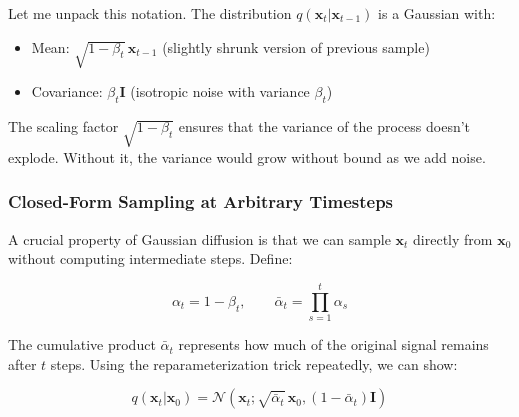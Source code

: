Let me unpack this notation. The distribution $q(\mathbf{x}_t | \mathbf{x}_{t-1})$ is a Gaussian with:
\begin{itemize}
    \item Mean: $\sqrt{1-\beta_t}\,\mathbf{x}_{t-1}$ (slightly shrunk version of previous sample)
    \item Covariance: $\beta_t \mathbf{I}$ (isotropic noise with variance $\beta_t$)
\end{itemize}

The scaling factor $\sqrt{1-\beta_t}$ ensures that the variance of the process doesn't explode. Without it, the variance would grow without bound as we add noise.

\subsubsection{Closed-Form Sampling at Arbitrary Timesteps}

A crucial property of Gaussian diffusion is that we can sample $\mathbf{x}_t$ directly from $\mathbf{x}_0$ without computing intermediate steps. Define:

\begin{equation}
\alpha_t = 1 - \beta_t, \qquad \bar{\alpha}_t = \prod_{s=1}^{t} \alpha_s
\label{eq:alpha_definitions}
\end{equation}

The cumulative product $\bar{\alpha}_t$ represents how much of the original signal remains after $t$ steps. Using the reparameterization trick repeatedly, we can show:

\begin{equation}
q(\mathbf{x}_t | \mathbf{x}_0) = \mathcal{N}\left(\mathbf{x}_t; \sqrt{\bar{\alpha}_t}\,\mathbf{x}_0, (1-\bar{\alpha}_t)\mathbf{I}\right)
\label{eq:closed_form_forward}
\end{equation}

